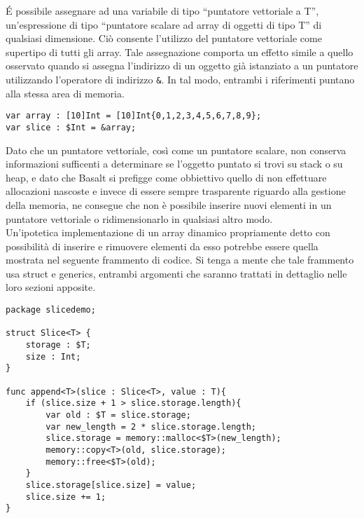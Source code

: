 É possibile assegnare ad una variabile di tipo “puntatore vettoriale a T”, un’espressione di tipo “puntatore scalare ad array di oggetti di tipo T” 
di qualsiasi dimensione. Ciò consente l'utilizzo del puntatore vettoriale come supertipo di tutti gli array. Tale assegnazione 
comporta un effetto simile a quello osservato quando si assegna l'indirizzo di un oggetto già istanziato a un puntatore utilizzando 
l'operatore di indirizzo \texttt{\&}. In tal modo, entrambi i riferimenti puntano alla stessa area di memoria. \\

\vspace{0.5cm}
\begin{lstlisting}[frame=single]
var array : [10]Int = [10]Int{0,1,2,3,4,5,6,7,8,9};
var slice : $Int = &array;
\end{lstlisting}
\vspace{0.5cm}

Dato che un puntatore vettoriale, così come un puntatore scalare, non conserva informazioni sufficenti a determinare se 
l’oggetto puntato si trovi su stack o su heap, e dato che Basalt si prefigge come obbiettivo quello di non 
effettuare allocazioni nascoste e invece di essere sempre trasparente riguardo alla gestione della memoria, ne consegue che non 
è possibile inserire nuovi elementi in un puntatore vettoriale o ridimensionarlo in qualsiasi altro modo. \\

Un’ipotetica implementazione di un array dinamico propriamente detto con possibilità di 
inserire e rimuovere elementi da esso potrebbe essere quella mostrata nel seguente frammento di codice. 
Si tenga a mente che tale frammento usa struct e generics, entrambi argomenti che saranno trattati in 
dettaglio nelle loro sezioni apposite. \\


\vspace{0.5cm}
\begin{lstlisting}[frame=single]
package slicedemo;

struct Slice<T> {
    storage : $T;
    size : Int;
}

func append<T>(slice : Slice<T>, value : T){
    if (slice.size + 1 > slice.storage.length){
        var old : $T = slice.storage; 
        var new_length = 2 * slice.storage.length;
        slice.storage = memory::malloc<$T>(new_length);
        memory::copy<T>(old, slice.storage);
        memory::free<$T>(old);
    }
    slice.storage[slice.size] = value;
    slice.size += 1;
}
\end{lstlisting}
\vspace{0.5cm}